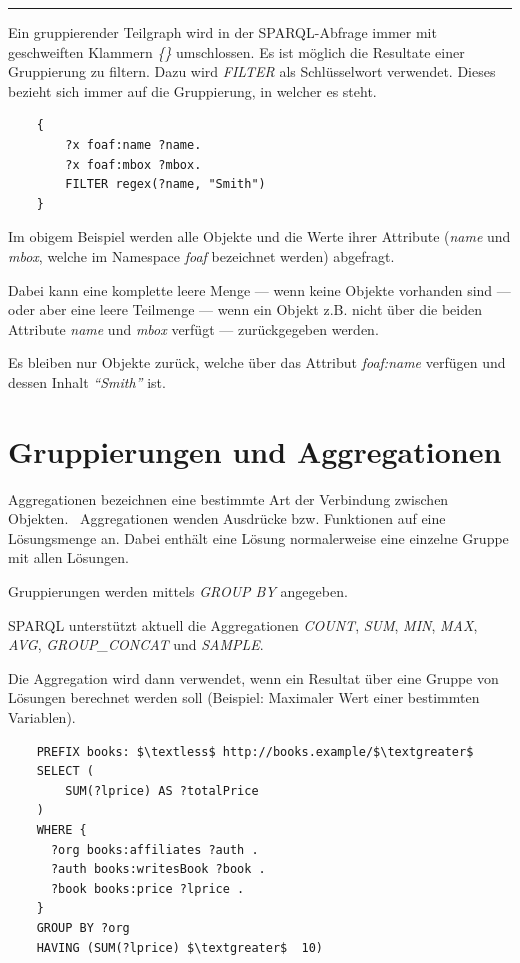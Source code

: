 \noindent\rule[1ex]{\textwidth}{1pt}

Ein gruppierender Teilgraph wird in der SPARQL-Abfrage immer mit geschweiften Klammern \textit{\{\}} umschlossen. Es ist möglich die Resultate einer Gruppierung zu filtern. Dazu wird \textit{FILTER} als Schlüsselwort verwendet. Dieses bezieht sich immer auf die Gruppierung, in welcher es steht.

\begin{lstlisting}
    {
        ?x foaf:name ?name.
        ?x foaf:mbox ?mbox.
        FILTER regex(?name, "Smith")
    }
\end{lstlisting}

Im obigem Beispiel werden alle Objekte und die Werte ihrer Attribute (\textit{name} und \textit{mbox}, welche im Namespace \textit{foaf} bezeichnet werden) abgefragt.

Dabei kann eine komplette leere Menge --- wenn keine Objekte vorhanden sind --- oder aber eine leere Teilmenge --- wenn ein Objekt z.B. nicht über die beiden Attribute \textit{name} und \textit{mbox} verfügt --- zurückgegeben werden.

Es bleiben nur Objekte zurück, welche über das Attribut \textit{foaf:name} verfügen und dessen Inhalt \textit{``Smith''} ist.

\section{Gruppierungen und Aggregationen}
\label{sec:sparql_gruppierungenaggregationen}
Aggregationen bezeichnen eine bestimmte Art der Verbindung zwischen Objekten.~\cite{wiki:aggregation} Aggregationen wenden Ausdrücke bzw. Funktionen auf eine Lösungsmenge an. Dabei enthält eine Lösung normalerweise eine einzelne Gruppe mit allen Lösungen.

Gruppierungen werden mittels \textit{GROUP BY} angegeben.

SPARQL unterstützt aktuell die Aggregationen \textit{COUNT}, \textit{SUM}, \textit{MIN}, \textit{MAX}, \textit{AVG}, \textit{GROUP\_CONCAT} und \textit{SAMPLE}.

Die Aggregation wird dann verwendet, wenn ein Resultat über eine Gruppe von Lösungen berechnet werden soll (Beispiel: Maximaler Wert einer bestimmten Variablen).

\lstset{language=SQL}
\begin{lstlisting}
    PREFIX books: $\textless$ http://books.example/$\textgreater$ 
    SELECT (
        SUM(?lprice) AS ?totalPrice
    )
    WHERE {
      ?org books:affiliates ?auth .
      ?auth books:writesBook ?book .
      ?book books:price ?lprice .
    }
    GROUP BY ?org
    HAVING (SUM(?lprice) $\textgreater$  10)
\end{lstlisting}
    
